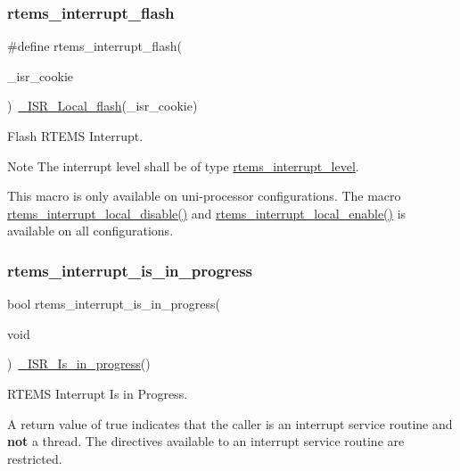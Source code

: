 \subsubsection{\texorpdfstring{rtems\_interrupt\_flash}{rtems\_interrupt\_flash}}
{\footnotesize\ttfamily \#define rtems\+\_\+interrupt\+\_\+flash(\begin{DoxyParamCaption}\item[{}]{\+\_\+isr\+\_\+cookie }\end{DoxyParamCaption})~\mbox{\hyperlink{group__RTEMSScoreISR_ga2ac9dcbae9ca059453a2042e5854f73f}{\+\_\+\+I\+S\+R\+\_\+\+Local\+\_\+flash}}(\+\_\+isr\+\_\+cookie)}



Flash R\+T\+E\+MS Interrupt. 

\begin{DoxyNote}{Note}
The interrupt level shall be of type \mbox{\hyperlink{group__ClassicINTR_ga9d815b0efd1f51936bb180683f26c436}{rtems\+\_\+interrupt\+\_\+level}}.
\end{DoxyNote}
This macro is only available on uni-\/processor configurations. The macro \mbox{\hyperlink{group__ClassicINTR_ga691a9f609c9d6bf071d0966b8b715fab}{rtems\+\_\+interrupt\+\_\+local\+\_\+disable()}} and \mbox{\hyperlink{group__ClassicINTR_gabd2556ab8902ebb660b470e144bdc55a}{rtems\+\_\+interrupt\+\_\+local\+\_\+enable()}} is available on all configurations. \mbox{\label{group__ClassicINTR_ga8e688f778a82fbde79a5f57412200b6e}} 
\subsubsection{\texorpdfstring{rtems\_interrupt\_is\_in\_progress}{rtems\_interrupt\_is\_in\_progress}}
{\footnotesize\ttfamily bool rtems\+\_\+interrupt\+\_\+is\+\_\+in\+\_\+progress(\begin{DoxyParamCaption}\item[{}]{void }\end{DoxyParamCaption})~\mbox{\hyperlink{group__RTEMSScoreISR_ga3b125bb9faac2fa94bd0ba0583cf5f77}{\+\_\+\+I\+S\+R\+\_\+\+Is\+\_\+in\+\_\+progress}}()}



R\+T\+E\+MS Interrupt Is in Progress. 

A return value of true indicates that the caller is an interrupt service routine and {\bfseries{not}} a thread. The directives available to an interrupt service routine are restricted. \mbox{\label{group__ClassicINTR_ga691a9f609c9d6bf071d0966b8b715fab}} 
